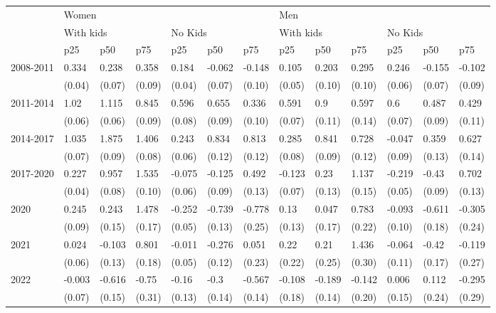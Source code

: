 \begin{tabular}{lllllllllllll}
\toprule
{} & \multicolumn{6}{l}{Women} & \multicolumn{6}{l}{Men} \\
{} & \multicolumn{3}{l}{With kids} & \multicolumn{3}{l}{No Kids} & \multicolumn{3}{l}{With kids} & \multicolumn{3}{l}{No Kids} \\
{} &       p25 &     p50 &     p75 &     p25 &     p50 &     p75 &       p25 &     p50 &     p75 &     p25 &     p50 &     p75 \\
\midrule
2008-2011 &     0.334 &   0.238 &   0.358 &   0.184 &  -0.062 &  -0.148 &     0.105 &   0.203 &   0.295 &   0.246 &  -0.155 &  -0.102 \\
          &    (0.04) &  (0.07) &  (0.09) &  (0.04) &  (0.07) &  (0.10) &    (0.05) &  (0.10) &  (0.10) &  (0.06) &  (0.07) &  (0.09) \\
2011-2014 &      1.02 &   1.115 &   0.845 &   0.596 &   0.655 &   0.336 &     0.591 &     0.9 &   0.597 &     0.6 &   0.487 &   0.429 \\
          &    (0.06) &  (0.06) &  (0.09) &  (0.08) &  (0.09) &  (0.10) &    (0.07) &  (0.11) &  (0.14) &  (0.07) &  (0.09) &  (0.11) \\
2014-2017 &     1.035 &   1.875 &   1.406 &   0.243 &   0.834 &   0.813 &     0.285 &   0.841 &   0.728 &  -0.047 &   0.359 &   0.627 \\
          &    (0.07) &  (0.09) &  (0.08) &  (0.06) &  (0.12) &  (0.12) &    (0.08) &  (0.09) &  (0.12) &  (0.09) &  (0.13) &  (0.14) \\
2017-2020 &     0.227 &   0.957 &   1.535 &  -0.075 &  -0.125 &   0.492 &    -0.123 &    0.23 &   1.137 &  -0.219 &   -0.43 &   0.702 \\
          &    (0.04) &  (0.08) &  (0.10) &  (0.06) &  (0.09) &  (0.13) &    (0.07) &  (0.13) &  (0.15) &  (0.05) &  (0.09) &  (0.13) \\
2020      &     0.245 &   0.243 &   1.478 &  -0.252 &  -0.739 &  -0.778 &      0.13 &   0.047 &   0.783 &  -0.093 &  -0.611 &  -0.305 \\
          &    (0.09) &  (0.15) &  (0.17) &  (0.05) &  (0.13) &  (0.25) &    (0.13) &  (0.17) &  (0.22) &  (0.10) &  (0.18) &  (0.24) \\
2021      &     0.024 &  -0.103 &   0.801 &  -0.011 &  -0.276 &   0.051 &      0.22 &    0.21 &   1.436 &  -0.064 &   -0.42 &  -0.119 \\
          &    (0.06) &  (0.13) &  (0.18) &  (0.05) &  (0.12) &  (0.23) &    (0.22) &  (0.25) &  (0.30) &  (0.11) &  (0.17) &  (0.27) \\
2022      &    -0.003 &  -0.616 &   -0.75 &   -0.16 &    -0.3 &  -0.567 &    -0.108 &  -0.189 &  -0.142 &   0.006 &   0.112 &  -0.295 \\
          &    (0.07) &  (0.15) &  (0.31) &  (0.13) &  (0.14) &  (0.14) &    (0.18) &  (0.14) &  (0.20) &  (0.15) &  (0.24) &  (0.29) \\
\bottomrule
\end{tabular}
